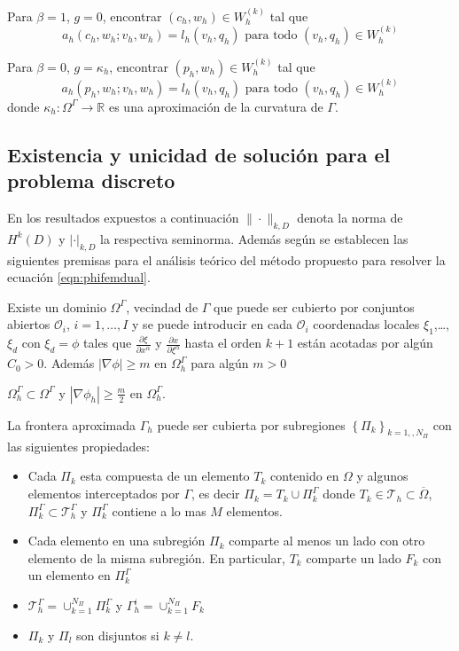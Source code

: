 Para $\beta=1$, $g=0$, encontrar $(c_h,w_h)\in W_h^{(k)}$ tal que
\begin{equation}
	a_h(c_h,w_h;v_h,w_h)=l_h(v_h,q_h)\text{ para todo } (v_h,q_h)\in W_h^{(k)}
	\label{eqn:problemach}
\end{equation}

Para $\beta=0$, $g=\kappa_h$, encontrar $(p_h,w_h)\in W_h^{(k)}$ tal que
\begin{equation}
	a_h(p_h,w_h;v_h,w_h)=l_h(v_h,q_h)\text{ para todo } (v_h,q_h)\in W_h^{(k)}
	\label{eqn:problemaph}
\end{equation}
donde $\kappa_h:\Omega^\Gamma \to\mathbb{R}$ es una aproximación de la curvatura de $\Gamma$.
\subsection{Existencia y unicidad de solución para el problema discreto}
En los resultados expuestos a continuación $\|\cdot\|_{k,D}$ denota la norma de $H^k(D)$ y $|\cdot|_{k,D}$ la respectiva seminorma. Además según  \citep{lozinski2019cutfem,duprez2020phi,duprez2022varphi} se establecen las siguientes premisas para el análisis teórico del método propuesto para resolver la ecuación \ref{eqn:phifemdual}.
\begin{premisa}
	Existe un dominio $\Omega^\Gamma$, vecindad de $\Gamma$   que puede ser cubierto por conjuntos abiertos $\mathcal{O}_i$, $i=1,\ldots,I$ y se puede introducir en cada $\mathcal{O}_i$ coordenadas locales $\xi_1$,\ldots, $\xi_d$ con $\xi_d=\phi$ tales que $\frac{\partial \xi}{\partial x^\alpha}$ y $\frac{\partial x}{\partial \xi^\alpha}$ hasta el orden $k+1$ están acotadas por algún $C_0>0$. Además $|\nabla \phi|\geq m$ en $\Omega_h^\Gamma$ para algún $m>0$
\end{premisa}
\begin{premisa}
	$\Omega_h^\Gamma\subset \Omega^\Gamma$ y $|\nabla \phi_h|\geq \frac{m}{2}$ en $\Omega_h^\Gamma$.
\end{premisa}
\begin{premisa}
	La frontera aproximada $\Gamma_h$ puede ser cubierta por subregiones $\left\{ \Pi_k\right\}_{k=1,,N_\Pi} $ con las siguientes propiedades:
	\begin{itemize}
		\item Cada $\Pi_k$ esta compuesta de un elemento $T_k$ contenido en  $\Omega$ y algunos elementos interceptados por $\Gamma$, es decir $\Pi_k = T_k \cup \Pi_k^\Gamma$ donde $T_k\in\mathcal{T}_h \subset \overline{\Omega}$, $\Pi_k^\Gamma\subset \mathcal{T}^\Gamma_h$ y $ \Pi_k^\Gamma$ contiene a lo mas $M$ elementos.
		\item Cada elemento en una subregión $\Pi_k$ comparte al menos un lado con otro elemento de la misma subregión. En particular, $T_k$ comparte un lado $F_k$ con un elemento en $\Pi_k^\Gamma$
		\item $\mathcal{T}^\Gamma_h = \cup_{k=1}^{N_\Pi} \Pi_k^\Gamma$ y $\Gamma_h^i = \cup_{k=1}^{N_\Pi} F_k$
		\item $\Pi_k$ y $\Pi_l$ son disjuntos si $k\neq l$.
	\end{itemize}
\end{premisa}
